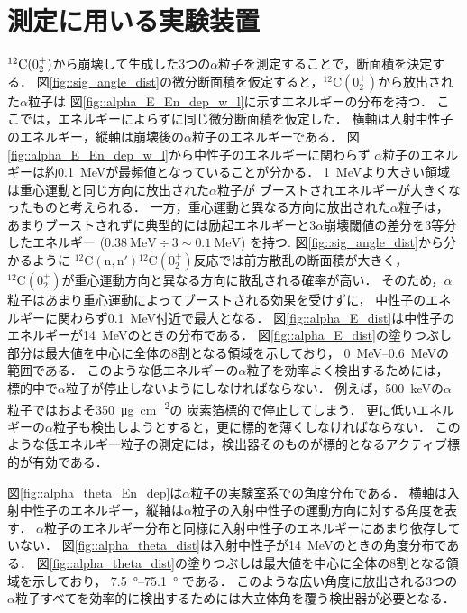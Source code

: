 \documentclass[../master]{subfiles}
\begin{document}
\section{測定に用いる実験装置}
\label{seq::detector_using_experiment}
${}^{12}{\rm C} (0_2^+)$から崩壊して生成した3つの$\alpha$粒子を測定することで，断面積を決定する．
図\ref{fig::sig_angle_dist}の微分断面積を仮定すると，${}^{12}\mathrm{C} (0_2^+)$から放出された$\alpha$粒子は
図\ref{fig::alpha_E_En_dep_w_l}に示すエネルギーの分布を持つ．
ここでは，エネルギーによらずに同じ微分断面積を仮定した．
横軸は入射中性子のエネルギー，縦軸は崩壊後の$\alpha$粒子のエネルギーである．
図\ref{fig::alpha_E_En_dep_w_l}から中性子のエネルギーに関わらず
$\alpha$粒子のエネルギーは約\SI{0.1}{\mega\electronvolt}が最頻値となっていることが分かる．
\SI{1}{\mega\electronvolt}より大きい領域は重心運動と同じ方向に放出された$\alpha$粒子が
ブーストされエネルギーが大きくなったものと考えられる．
一方，重心運動と異なる方向に放出された$\alpha$粒子は，
あまりブーストされずに典型的には励起エネルギーと3$\alpha$崩壊閾値の差分を3等分したエネルギー
($\SI{0.38}{\mega\electronvolt}\div 3 \sim \SI{0.1}{\mega\electronvolt}$) を持つ.
図\ref{fig::sig_angle_dist}から分かるように
${}^{12}\mathrm{C}(\mathrm{n},\mathrm{n}'){}^{12}\mathrm{C}(0_2^+)$反応では前方散乱の断面積が大きく，
${}^{12}\mathrm{C} (0_2^+)$が重心運動方向と異なる方向に散乱される確率が高い．
そのため，$\alpha$粒子はあまり重心運動によってブーストされる効果を受けずに，
中性子のエネルギーに関わらず\SI{0.1}{\mega\electronvolt}付近で最大となる．
図\ref{fig::alpha_E_dist}は中性子のエネルギーが\SI{14}{\mega\electronvolt}のときの分布である．
図\ref{fig::alpha_E_dist}の塗りつぶし部分は最大値を中心に全体の8割となる領域を示しており，
\SIrange{0}{0.6}{\mega\electronvolt}の範囲である．
このような低エネルギーの$\alpha$粒子を効率よく検出するためには，
標的中で$\alpha$粒子が停止しないようにしなければならない．
例えば，\SI{500}{\kilo\electronvolt}の$\alpha$粒子ではおよそ\SI{350}{\micro\gram\per\square\centi\metre}の
炭素箔標的で停止してしまう．
更に低いエネルギーの$\alpha$粒子も検出しようとすると，更に標的を薄くしなければならない．
このような低エネルギー粒子の測定には，検出器そのものが標的となるアクティブ標的が有効である．

図\ref{fig::alpha_theta_En_dep}は$\alpha$粒子の実験室系での角度分布である．
横軸は入射中性子のエネルギー，縦軸は$\alpha$粒子の入射中性子の運動方向に対する角度を表す．
$\alpha$粒子のエネルギー分布と同様に入射中性子のエネルギーにあまり依存していない．
図\ref{fig::alpha_theta_dist}は入射中性子が\SI{14}{\mega\electronvolt}のときの角度分布である．
図\ref{fig::alpha_theta_dist}の塗りつぶしは最大値を中心に全体の8割となる領域を示しており，
\SIrange{7.5}{75.1}{\degree} である．
このような広い角度に放出される3つの$\alpha$粒子すべてを効率的に検出するためには大立体角を覆う検出器が必要となる．
\end{document}
